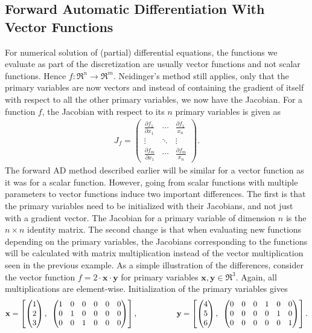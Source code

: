 \subsection{Forward Automatic Differentiation With Vector Functions}
\label{sec:FADWithMultipleParameters}
For numerical solution of (partial) differential equations, the functions we evaluate as part of the discretization are usually vector functions and not scalar functions. Hence $f: \Re^n \rightarrow \Re^m$. Neidinger's method still applies, only that the primary variables are now vectors and instead of containing the gradient of itself with respect to all the other primary variables, we now have the Jacobian. For a function $f$, the Jacobian with respect to its $n$ primary variables is given as
\begin{align*}
    J_f  =
    \begin{pmatrix}
        \frac{\partial f_1}{\partial x_1} & \dotsb & \frac{\partial f_1}{x_n}\\
        \vdots & \ddots & \vdots \\
        \frac{\partial f_m}{\partial x_1} & \dotsb & \frac{\partial f_m}{x_n}
    \end{pmatrix}.
\end{align*}
The forward AD method described earlier will be similar for a vector function as it was for a scalar function. However, going from scalar functions with multiple parameters to vector functions induce two important differences. The first is that the primary variables need to be initialized with their Jacobians, and not just with a gradient vector. The Jacobian for a primary variable of dimension $n$ is the $n \times n$ identity matrix. The second change is that when evaluating new functions depending on the primary variables, the Jacobians corresponding to the functions will be calculated with matrix multiplication instead of the vector multiplication seen in the previous example. As a simple illustration of the differences, consider the vector function $f = 2\cdot \textbf{x}\cdot \textbf{y}$ for primary variables $\textbf{x},\textbf{y}\in \Re^3$. Again, all multiplications are element-wise. Initialization of the primary variables gives
\begin{equation}
    \label{def:VectorAD}
    \textbf{x} = \left[\begin{pmatrix}1\\2\\3
    \end{pmatrix},\hspace{0.5em}\begin{pmatrix}
    1&0&0&0&0&0\\
    0&1&0&0&0&0\\
    0&0&1&0&0&0\end{pmatrix} \right],
    \hspace{5em}
    \textbf{y} = \left[\begin{pmatrix}4\\5\\6
    \end{pmatrix},\hspace{0.5em}\begin{pmatrix}
    0&0&0&1&0&0\\
    0&0&0&0&1&0\\
    0&0&0&0&0&1\end{pmatrix} \right].
\end{equation}
